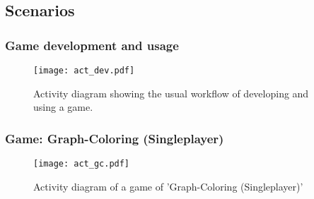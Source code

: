 \subsection{Scenarios}

\subsubsection{Game development and usage}
\begin{figure}[h!]
	\centering
	\texttt{[image: act\_dev.pdf]}
	\caption{Activity diagram showing the usual workflow of developing and using a game.}
	\label{img:ACTDEV}
\end{figure}
\pagebreak
\subsubsection{Game: Graph-Coloring (Singleplayer)}
\begin{figure}[h!]
	\centering
	\texttt{[image: act\_gc.pdf]}
	\caption{Activity diagram of a game of 'Graph-Coloring (Singleplayer)'}
	\label{img:ACTGC}
\end{figure}